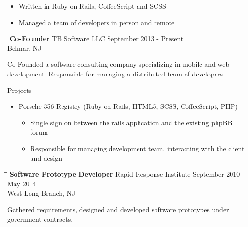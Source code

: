 \documentclass{res}
\begin{document}
\begin{resume}
    \begin{itemize}
        \item Written in Ruby on Rails, CoffeeScript and SCSS
        \item Managed a team of developers in person and remote
    \end{itemize}


   \begin{tabbing}
   \hspace{2.3in}\= \hspace{2.6in}\= \kill %
    {\bf Co-Founder} \>TB Software LLC     \>September 2013 - Present\\
                             \>Belmar, NJ
   \end{tabbing}\vspace{-20pt}      %
    Co-Founded a software consulting company specializing in mobile and web development. 
    Responsible for managing a distributed team of developers.

    Projects
    \begin{itemize}
        \item Porsche 356 Registry (Ruby on Rails, HTML5, SCSS, CoffeeScript, PHP)
        \begin{itemize}
            \item Single sign on between the rails application and the existing phpBB forum
            \item Responsible for managing development team, interacting with the client and design
        \end{itemize}
    \end{itemize}

   \begin{tabbing}
   \hspace{2.3in}\= \hspace{2.6in}\= \kill %
    {\bf Software Prototype Developer} \>Rapid Response Institute     \>September 2010 - May 2014\\
                             \>West Long Branch, NJ
   \end{tabbing}\vspace{-20pt}      %
   Gathered requirements, designed and developed software prototypes under government contracts.


\end{resume}
\end{document}
